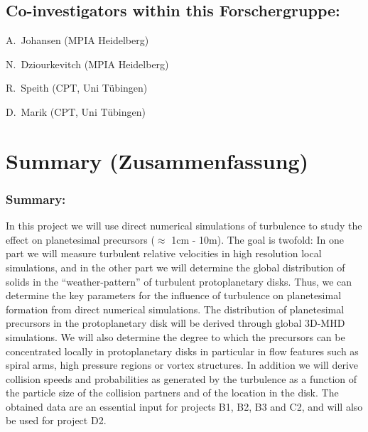 \subsection{Co-investigators within this Forschergruppe:}
\begin{coilist}
\item A.~Johansen (MPIA Heidelberg)
\item N.~Dziourkevitch (MPIA Heidelberg)
\item R.~Speith (CPT, Uni T\"ubingen)
\item D.~Marik (CPT, Uni T\"ubingen)
\end{coilist}


\section{Summary (Zusammenfassung)}
\subsubsection{Summary:} 
In this project we will use direct numerical simulations of turbulence to
study the effect on planetesimal precursors ($\approx$ 1cm - 10m). The goal
is twofold: In one part we will measure turbulent relative velocities in
high resolution local simulations, and in the other part we will determine
the global distribution of solids in the ``weather-pattern'' of turbulent
protoplanetary disks.  Thus, we can determine the key parameters for the
influence of turbulence on planetesimal formation from direct numerical
simulations.  The distribution of planetesimal precursors in the
protoplanetary disk will be derived through global 3D-MHD simulations. We
will also determine the degree to which the precursors can be concentrated
locally in protoplanetary disks in particular in flow features such as
spiral arms, high pressure regions or vortex structures.  In addition we
will derive collision speeds and probabilities as generated by the
turbulence as a function of the particle size of the collision partners and
of the location in the disk. The obtained data are an essential input for
projects B1, B2, B3 and C2, and will also be used for project D2.
%

